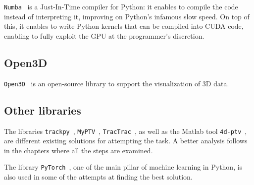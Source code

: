 \texttt{Numba}~\cite{numba} is a Just-In-Time compiler for Python: it enables to compile the code instead of interpreting it, improving on Python's infamous slow speed.
On top of this, it enables to write Python kernels that can be compiled into CUDA code, enabling to fully exploit the GPU at the programmer's discretion.

\subsection{Open3D}

\texttt{Open3D}~\cite{open3d} is an open-source library to support the visualization of 3D data.

\subsection{Other libraries}

The libraries \texttt{trackpy}~\cite{trackpy}, \texttt{MyPTV}~\cite{myptv}, \texttt{TracTrac}~\cite{tractrac}, as well as the Matlab tool \texttt{4d-ptv}~\cite{fourdptv}, are different existing solutions for attempting the task. A better analysis follows in the chapters where all the steps are examined.

The library \texttt{PyTorch}~\cite{pytorch}, one of the main pillar of machine learning in Python, is also used in some of the attempts at finding the best solution.
